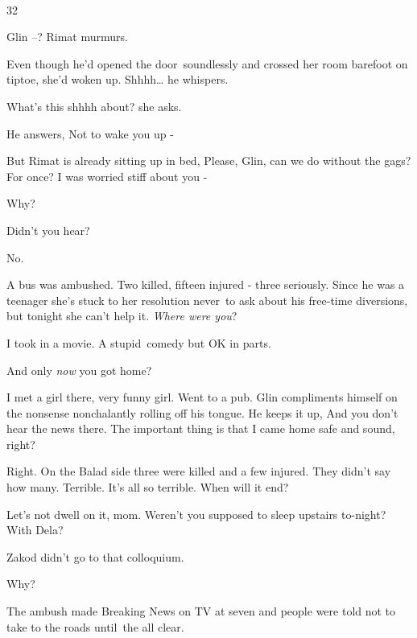 \documentclass[twoside,11pt]{book}
\begin{document}
~

32\ 

{\textquotedbl}Glin --?{\textquotedbl} Rimat murmurs. 

Even though he'd opened the door\ soundlessly and crossed her room barefoot on tiptoe, she'd woken up.
{\textquotedbl}Shhhh{\dots}{\textquotedbl} he whispers. 

{\textquotedbl}What{}'s this shhhh about?{\textquotedbl} she asks.

He answers, {\textquotedbl}Not to wake you up -{\textquotedbl} 

But Rimat is already sitting up in bed, {\textquotedbl}Please, Glin, can we do without the gags? For once? I was worried
stiff about you -{\textquotedbl} 

{\textquotedbl}Why?{\textquotedbl} 

{\textquotedbl}Didn't you hear?{\textquotedbl} 

{\textquotedbl}No.{\textquotedbl} 

{\textquotedbl}A bus was ambushed. Two killed, fifteen injured - three seriously.{\textquotedbl} Since he was a teenager
she's stuck to her resolution never{\ }to ask about his
free{{}-}time diversions, but tonight she can't help it.
{\textquotedbl}\textit{Where were you}?{\textquotedbl} 

{\textquotedbl}I took in a movie. A stupid{\ }comedy but OK in
parts.{\textquotedbl} 

{\textquotedbl}And only \textit{now} you got home?{\textquotedbl} ~

{\textquotedbl}I met a girl there, very funny girl. Went to a pub.{\textquotedbl} Glin compliments himself on the
nonsense nonchalantly rolling off his tongue. He keeps it up, {\textquotedbl}And you don't hear the news there. The
important thing is that I came home safe and sound, right?{\textquotedbl} 

{\textquotedbl}Right. On the Balad side three were killed and a few injured. They didn't say how many. Terrible. It's
all so terrible. When will it end?{\textquotedbl} 

{\textquotedbl}Let's not dwell on it, mom. Weren't you supposed to sleep upstairs to-night? With Dela?{\textquotedbl} 

{\textquotedbl}Zakod didn't go to that colloquium.{\textquotedbl} 

{\textquotedbl}Why?{\textquotedbl} 

{\textquotedbl}The ambush made Breaking News on TV at seven and people were told not to take to the roads until~the all
clear.{\textquotedbl} 
\end{document}

